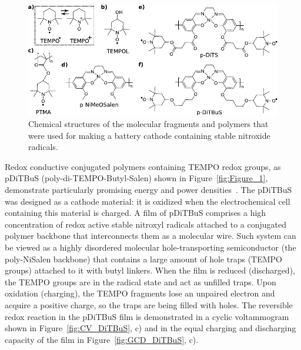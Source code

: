 \begin{figure}[h]
\center
	\includegraphics[width=1\textwidth]{./electrochemistry/figures/materials/molecules.pdf}
	\caption{Chemical structures of the molecular fragments and polymers that were used for making a battery cathode containing stable nitroxide radicals.}
	\label{fig:molecules}
\end{figure}



Redox conductive conjugated polymers containing TEMPO redox groups, as pDiTBuS (poly-di-TEMPO-Butyl-Salen) shown in Figure~\ref{fig:Figure_1}, demonstrate particularly promising energy and power densities~\cite{Vereshchagin2020}. The pDiTBuS was designed as a cathode material: it is oxidized when the electrochemical cell containing this material is charged. A film of pDiTBuS comprises a high concentration of redox active stable nitroxyl radicals attached to a conjugated polymer backbone that interconnects them as a molecular wire. Such system can be viewed as a highly disordered molecular hole-transporting semiconductor (the poly-NiSalen backbone) that contains a large amount of hole traps (TEMPO groups) attached to it with butyl linkers. When the film is reduced (discharged), the TEMPO groups are in the radical state and act as unfilled traps. Upon oxidation (charging), the TEMPO fragments lose an unpaired electron and acquire a positive charge, so the traps are being filled with holes. The reversible redox reaction in the pDiTBuS film is demonstrated in a cyclic voltammogram shown in Figure~\ref{fig:CV_DiTBuS}, c) and in the equal charging and discharging capacity of the film in Figure~\ref{fig:GCD_DiTBuS}, c).


